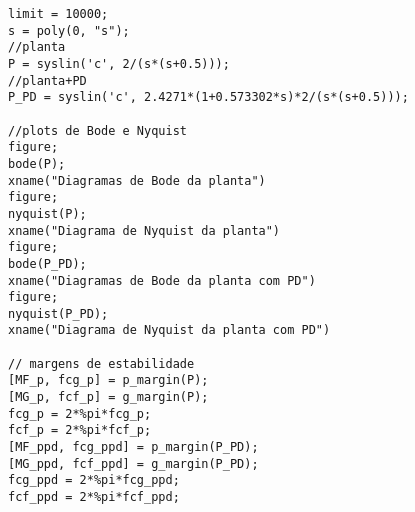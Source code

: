 \begin{lstlisting} 
limit = 10000;
s = poly(0, "s");
//planta
P = syslin('c', 2/(s*(s+0.5)));
//planta+PD
P_PD = syslin('c', 2.4271*(1+0.573302*s)*2/(s*(s+0.5)));

//plots de Bode e Nyquist
figure;
bode(P);
xname("Diagramas de Bode da planta")
figure;
nyquist(P);
xname("Diagrama de Nyquist da planta")
figure;
bode(P_PD);
xname("Diagramas de Bode da planta com PD")
figure;
nyquist(P_PD);
xname("Diagrama de Nyquist da planta com PD")

// margens de estabilidade
[MF_p, fcg_p] = p_margin(P);
[MG_p, fcf_p] = g_margin(P);
fcg_p = 2*%pi*fcg_p;
fcf_p = 2*%pi*fcf_p;
[MF_ppd, fcg_ppd] = p_margin(P_PD);
[MG_ppd, fcf_ppd] = g_margin(P_PD);
fcg_ppd = 2*%pi*fcg_ppd;
fcf_ppd = 2*%pi*fcf_ppd;

\end{lstlisting}


